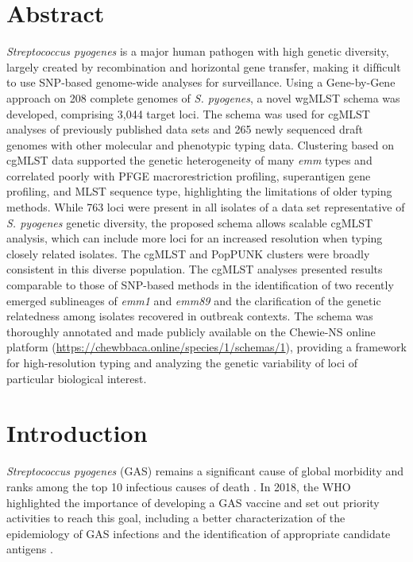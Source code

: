 \section{Abstract} \label{sec:ch4_abstract}

\textit{Streptococcus pyogenes} is a major human pathogen with high genetic diversity, largely created by recombination and horizontal gene transfer, making it difﬁcult to use \ac{SNP}-based genome-wide analyses for surveillance. Using a Gene-by-Gene approach on 208 complete genomes of \textit{S. pyogenes}, a novel \ac{wgMLST} schema was developed, comprising 3,044 target loci. The schema was used for \ac{cgMLST} analyses of previously published data sets and 265 newly sequenced draft genomes with other molecular and phenotypic typing data. Clustering based on \ac{cgMLST} data supported the genetic heterogeneity of many \textit{emm} types and correlated poorly with \ac{PFGE} macrorestriction proﬁling, superantigen gene proﬁling, and \ac{MLST} sequence type, highlighting the limitations of older typing methods. While 763 loci were present in all isolates of a data set representative of \textit{S. pyogenes} genetic diversity, the proposed schema allows scalable \ac{cgMLST} analysis, which can include more loci for an increased resolution when typing closely related isolates. The \ac{cgMLST} and PopPUNK clusters were broadly consistent in this diverse population. The \ac{cgMLST} analyses presented results comparable to those of \ac{SNP}-based methods in the identiﬁcation of two recently emerged sublineages of \textit{emm1} and \textit{emm89} and the clariﬁcation of the genetic relatedness among isolates recovered in outbreak contexts. The schema was thoroughly annotated and made publicly available on the \ac{Chewie-NS} online platform (\url{https://chewbbaca.online/species/1/schemas/1}), providing a framework for high-resolution typing and analyzing the genetic variability of loci of particular biological interest.

\section{Introduction} \label{sec:ch4_introduction}

\textit{Streptococcus pyogenes} (\ac{GAS}) remains a signiﬁcant cause of global morbidity and ranks among the top 10 infectious causes of death \cite{carapetis_global_2005}. In 2018, the \ac{WHO} highlighted the importance of developing a \ac{GAS} vaccine and set out priority activities to reach this goal, including a better characterization of the epidemiology of \ac{GAS} infections and the identiﬁcation of appropriate candidate antigens \cite{vekemans_path_2019}.


